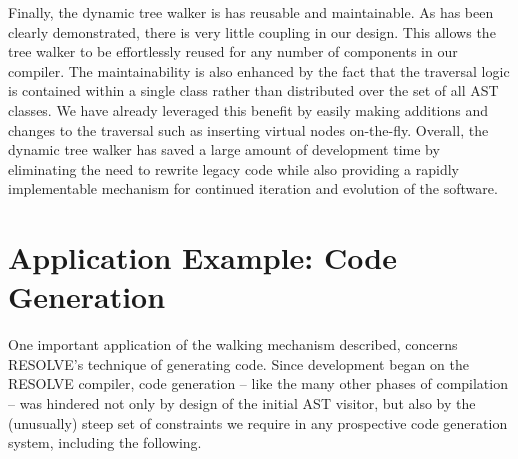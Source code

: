 \documentclass[times]{speauth}
\begin{document}
Finally, the dynamic tree walker is has reusable and maintainable. As has been clearly demonstrated, there is very little coupling in our design. This allows the tree walker to be effortlessly reused for any number of components in our compiler. The maintainability is also enhanced by the fact that the traversal logic is contained within a single class rather than distributed over the set of all AST classes. We have already leveraged this benefit by easily making additions and changes to the traversal such as inserting virtual nodes on-the-fly. Overall, the dynamic tree walker has saved a large amount of development time by eliminating the need to rewrite legacy code while also providing a rapidly implementable mechanism for continued iteration and evolution of the software.


\section{Application Example: Code Generation}
\vspace{-2pt}

One important application of the walking mechanism described, concerns RESOLVE's technique of generating code. Since development began on the RESOLVE compiler, code generation -- like the many other phases of compilation -- was hindered not only by design of the initial  AST visitor, but also by the (unusually) steep set of constraints we require in any prospective code generation system, including the following.
\end{document}
